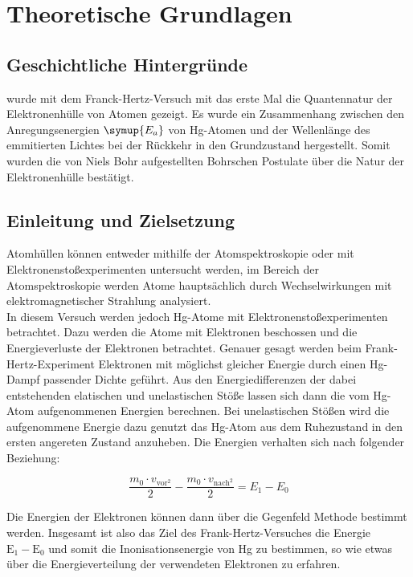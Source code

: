 \section{Theoretische Grundlagen}

    \subsection{Geschichtliche Hintergründe}

         wurde mit dem Franck-Hertz-Versuch mit das erste Mal die Quantennatur der Elektronenhülle von Atomen gezeigt. Es wurde ein 
        Zusammenhang zwischen den Anregungsenergien $\symup{E_a}$ von Hg-Atomen und der Wellenlänge des emmitierten Lichtes bei der Rückkehr 
        in den Grundzustand hergestellt. Somit wurden die von Niels Bohr aufgestellten Bohrschen Postulate über die Natur der Elektronenhülle 
        bestätigt. 

    \subsection{Einleitung und Zielsetzung}

        \noindent Atomhüllen können entweder mithilfe der Atomspektroskopie oder mit Elektronenstoßexperimenten untersucht werden, im Bereich der 
        Atomspektroskopie werden Atome hauptsächlich durch Wechselwirkungen mit elektromagnetischer Strahlung analysiert.\\
        \noindent In diesem Versuch werden jedoch Hg-Atome mit Elektronenstoßexperimenten betrachtet. Dazu werden die Atome mit Elektronen 
        beschossen und die Energieverluste der Elektronen betrachtet. Genauer gesagt werden beim Frank-Hertz-Experiment Elektronen mit 
        möglichst gleicher Energie durch einen Hg-Dampf passender Dichte geführt. Aus den Energiedifferenzen der dabei entstehenden elatischen 
        und unelastischen Stöße lassen sich dann die vom Hg-Atom aufgenommenen Energien berechnen. Bei unelastischen Stößen wird die 
        aufgenommene Energie dazu genutzt das Hg-Atom aus dem Ruhezustand in den ersten angereten Zustand anzuheben. Die Energien verhalten sich 
        nach folgender Beziehung:

        \begin{equation*}
            \frac{m_0 \cdot v_{\text{vor}^2}}{2} - \frac{m_0 \cdot v_{\text{nach}^2}}{2} = E_1 - E_0
        \end{equation*}

        \noindent Die Energien der Elektronen können dann über die Gegenfeld Methode bestimmt werden.
        Insgesamt ist also das Ziel des Frank-Hertz-Versuches die Energie $\text{E}_1 - \text{E}_0$ und somit die Inonisationsenergie von Hg zu bestimmen, 
        so wie etwas über die Energieverteilung der verwendeten Elektronen zu erfahren.

